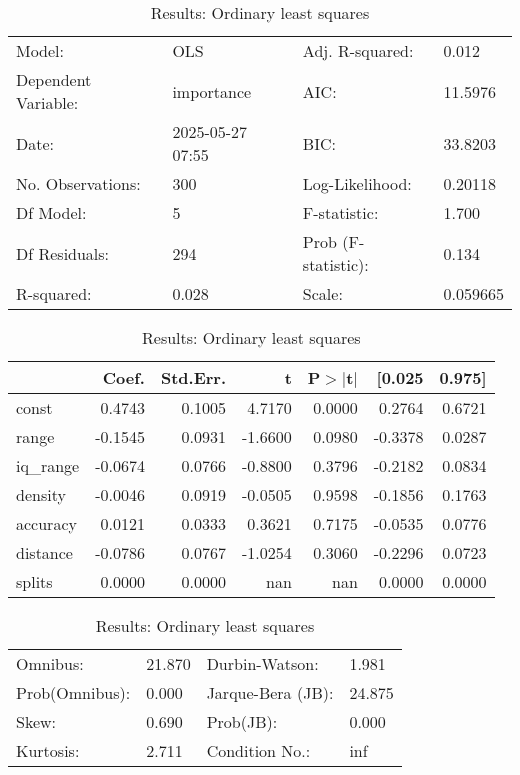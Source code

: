 \begin{table}
\caption{Results: Ordinary least squares}
\label{}
\begin{center}
\begin{tabular}{llll}
\hline
Model:              & OLS              & Adj. R-squared:     & 0.012     \\
Dependent Variable: & importance       & AIC:                & 11.5976   \\
Date:               & 2025-05-27 07:55 & BIC:                & 33.8203   \\
No. Observations:   & 300              & Log-Likelihood:     & 0.20118   \\
Df Model:           & 5                & F-statistic:        & 1.700     \\
Df Residuals:       & 294              & Prob (F-statistic): & 0.134     \\
R-squared:          & 0.028            & Scale:              & 0.059665  \\
\hline
\end{tabular}
\end{center}

\begin{center}
\begin{tabular}{lrrrrrr}
\hline
          &   Coef. & Std.Err. &       t & P$> |$t$|$ &  [0.025 & 0.975]  \\
\hline
const     &  0.4743 &   0.1005 &  4.7170 &      0.0000 &  0.2764 & 0.6721  \\
range     & -0.1545 &   0.0931 & -1.6600 &      0.0980 & -0.3378 & 0.0287  \\
iq\_range & -0.0674 &   0.0766 & -0.8800 &      0.3796 & -0.2182 & 0.0834  \\
density   & -0.0046 &   0.0919 & -0.0505 &      0.9598 & -0.1856 & 0.1763  \\
accuracy  &  0.0121 &   0.0333 &  0.3621 &      0.7175 & -0.0535 & 0.0776  \\
distance  & -0.0786 &   0.0767 & -1.0254 &      0.3060 & -0.2296 & 0.0723  \\
splits    &  0.0000 &   0.0000 &     nan &         nan &  0.0000 & 0.0000  \\
\hline
\end{tabular}
\end{center}

\begin{center}
\begin{tabular}{llll}
\hline
Omnibus:       & 21.870 & Durbin-Watson:    & 1.981   \\
Prob(Omnibus): & 0.000  & Jarque-Bera (JB): & 24.875  \\
Skew:          & 0.690  & Prob(JB):         & 0.000   \\
Kurtosis:      & 2.711  & Condition No.:    & inf     \\
\hline
\end{tabular}
\end{center}
\end{table}
